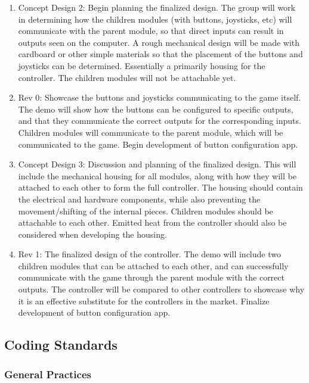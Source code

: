 \documentclass[a4]{article}
\begin{document}
\begin{enumerate}
	\item \textcolor{McMasterMaroon}{Concept Design 2}: Begin planning the finalized design. The group will work in determining how the children modules (with buttons, joysticks, etc) will communicate with the parent module, so that direct inputs can result in outputs seen on the computer. A rough mechanical design will be made with cardboard or other simple materials so that the placement of the buttons and joysticks can be determined. Essentially a primarily housing for the controller. The children modules will not be attachable yet.
	\item \textcolor{McMasterMaroon}{Rev 0}: Showcase the buttons and joysticks communicating to the game itself. The demo will show how the buttons can be configured to specific outputs, and that they communicate the correct outputs for the corresponding inputs. Children modules will communicate to the parent module, which will be communicated to the game. Begin development of button configuration app.
	\item \textcolor{McMasterMaroon}{Concept Design 3}: Discussion and planning of the finalized design. This will include the mechanical housing for all modules, along with how they will be attached to each other to form the full controller. The housing should contain the electrical and hardware components, while also preventing the movement/shifting of the internal pieces. Children modules should be attachable to each other. Emitted heat from the controller should also be considered when developing the housing.
	\item \textcolor{McMasterMaroon}{Rev 1}: The finalized design of the controller. The demo will include two children modules that can be attached to each other, and can successfully communicate with the game through the parent module with the correct outputs. The controller will be compared to other controllers to showcase why it is an effective substitute for the controllers in the market. Finalize development of button configuration app.
\end{enumerate}


\clearpage
\subsection{Coding Standards}

\subsubsection{General Practices}
\end{document}
